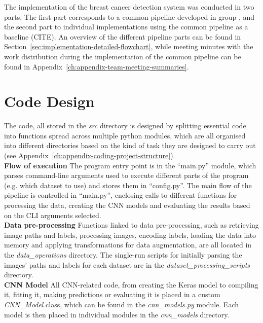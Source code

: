The implementation of the breast cancer detection system was conducted in two parts. The first part corresponds to a common pipeline developed in group \citep{adam_jaamour_2020_3975093}, and the second part to individual implementations using the common pipeline as a baseline (CITE). An overview of the different pipeline parts can be found in Section~\ref{sec:implementation-detailed-flowchart}, while meeting minutes with the work distribution during the implementation of the common pipeline can be found in Appendix~\ref{ch:appendix-team-meeting-summaries}.


\section{Code Design}

The code, all stored in the \textit{src} directory is designed by splitting essential code into functions spread across multiple python modules, which are all organised into different directories based on the kind of task they are designed to carry out (see Appendix~\ref{ch:appendix-coding-project-structure}).\\

\textbf{Flow of execution} \space The program entry point is in the ``main.py'' module, which parses command-line arguments used to execute different parts of the program (e.g. which dataset to use) and stores them in ``config.py''. The main flow of the pipeline is controlled in ``main.py'', enclosing calls to different functions for processing the data, creating the CNN models and evaluating the results based on the CLI arguments selected.\\

\textbf{Data pre-processing} \space Functions linked to data pre-processing, such as retrieving image paths and labels, processing images, encoding labels, loading the data into memory and applying transformations for data augmentation, are all located in the \textit{data\_operations} directory. The single-run scripts for initially parsing the images' paths and labels for each dataset are in the \textit{dataset\_processing\_scripts} directory.\\

\textbf{CNN Model} \space All CNN-related code, from creating the Keras model to compiling it, fitting it, making predictions or evaluating it is placed in a custom \textit{CNN\_Model} class, which can be found in the \textit{cnn\_models.py} module. Each model is then placed in individual modules in the \textit{cnn\_models} directory.\\

